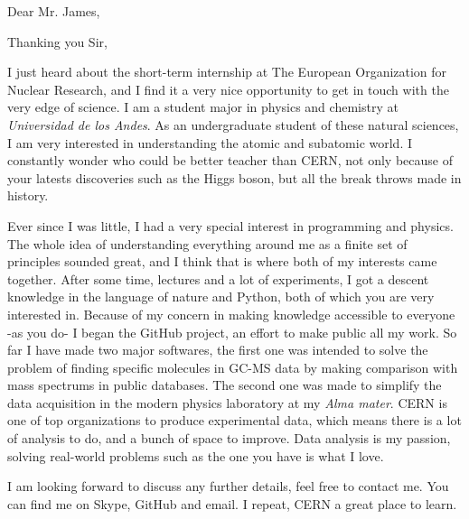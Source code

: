 \documentclass[11pt,letterpaper, sans]{moderncv}        %
\begin{document}
\date{October 25, 2016}
\opening{Dear Mr. James,}
\closing{Thanking you Sir,}
\makelettertitle

I just heard about the short-term internship at The European Organization for Nuclear Research, and I find it a very nice opportunity to get in touch with the very edge of science. I am a student major in physics and chemistry at \textit{Universidad de los Andes}. As an undergraduate student of these natural sciences, I am very interested in understanding the atomic and subatomic world. I constantly wonder who could be better teacher than CERN, not only because of your latests discoveries such as the Higgs boson, but all the break throws made in history. 

Ever since I was little, I had a very special interest in programming and physics. The whole idea of understanding everything around me as a finite set of principles sounded great, and I think that is where both of my interests came together. After some time, lectures and a lot of experiments, I got a descent knowledge in the language of nature and Python, both of which you are very interested in. Because of my concern in making knowledge accessible to everyone -as you do- I began the GitHub project, an effort to make public all my work. So far I have made two major softwares, the first one was intended to solve the problem of finding specific molecules in GC-MS data by making comparison with mass spectrums in public databases. The second one was made to simplify the data acquisition in the modern physics laboratory at my \textit{Alma mater}. CERN is one of top organizations to produce experimental data, which means there is a lot of analysis to do, and a bunch of space to improve. Data analysis is my passion, solving real-world problems such as the one you have is what I love. 


I am looking forward to discuss any further details, feel free to contact me. You can find me on Skype, GitHub and email. I repeat, CERN a great place to learn.

\makeletterclosing
\end{document}
